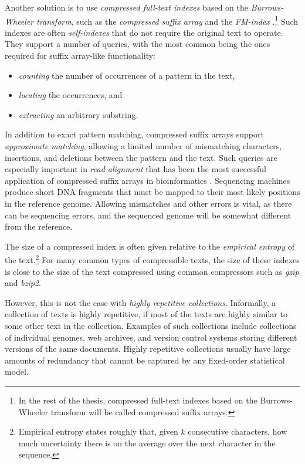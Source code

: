 Another solution is to use \emph{compressed full-text indexes} \cite{Navarro2007} based on the \emph{Burrows-Wheeler transform}, such as the \emph{compressed suffix array} \cite{Grossi2005} and the \emph{FM-index} \cite{Ferragina2005a}.\footnote{In the rest of the thesis, compressed full-text indexes based on the Burrows-Wheeler transform will be called compressed suffix arrays.} Such indexes are often \emph{self-indexes} that do not require the original text to operate. They support a number of queries, with the most common being the ones required for suffix array-like functionality:
\begin{itemize}

\item \emph{counting} the number of occurrences of a pattern in the text,

\item \emph{locating} the occurrences, and

\item \emph{extracting} an arbitrary substring.

\end{itemize}

In addition to exact pattern matching, compressed suffix arrays support \emph{approximate matching}, allowing a limited number of mismatching characters, insertions, and deletions between the pattern and the text. Such queries are especially important in \emph{read alignment} that has been the most successful application of compressed suffix arrays in bioinformatics \cite{Lam2008,Langmead2009,Li2009,Li2009a,Li2010,Liu2011}. Sequencing machines produce short DNA fragments that must be mapped to their most likely positions in the reference genome. Allowing mismatches and other errors is vital, as there can be sequencing errors, and the sequenced genome will be somewhat different from the reference.

The size of a compressed index is often given relative to the \emph{empirical entropy} of the text.\footnote{Empirical entropy states roughly that, given $k$ consecutive characters, how much uncertainty there is on the average over the next character in the sequence.} For many common types of compressible texts, the size of these indexes is close to the size of the text compressed using common compressors such as \emph{gzip} and \emph{bzip2}.

However, this is not the case with \emph{highly repetitive collections}. Informally, a collection of texts is highly repetitive, if most of the texts are highly similar to some other text in the collection. Examples of such collections include collections of individual genomes, web archives, and version control systems storing different versions of the same documents. Highly repetitive collections usually have large amounts of redundancy that cannot be captured by any fixed-order statistical model.

